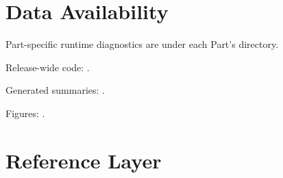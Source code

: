 \documentclass[12pt,a4paper]{article}
\begin{document}
\section*{Data Availability}
Part-specific runtime diagnostics are under each Part's  directory.

Release-wide code: .

Generated summaries: .

Figures: .


\section{Reference Layer}


\end{document}
